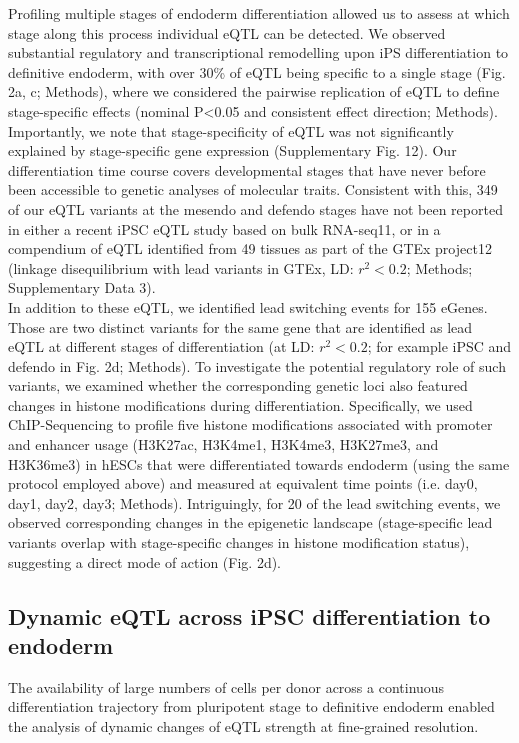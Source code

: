 Profiling multiple stages of endoderm differentiation allowed us to assess at which stage along this process individual eQTL can be detected. 
We observed substantial regulatory and transcriptional remodelling upon iPS differentiation to definitive endoderm, with over 30\% of eQTL being specific to a single stage (Fig. 2a, c; Methods), where we considered the pairwise replication of eQTL to define stage-specific effects (nominal P<0.05 and consistent effect direction; Methods). 
Importantly, we note that stage-specificity of eQTL was not significantly explained by stage-specific gene expression (Supplementary Fig. 12). 
Our differentiation time course covers developmental stages that have never before been accessible to genetic analyses of molecular traits. 
Consistent with this, 349 of our eQTL variants at the mesendo and defendo stages have not been reported in either a recent iPSC eQTL study based on bulk RNA-seq11, or in a compendium of eQTL identified from 49 tissues as part of the GTEx project12 (linkage disequilibrium with lead variants in GTEx, LD: $r^2<0.2$; Methods; Supplementary Data 3).\\

In addition to these eQTL, we identified lead switching events for 155 eGenes. 
Those are two distinct variants for the same gene that are identified as lead eQTL at different stages of differentiation (at LD: $r^2<0.2$; for example iPSC and defendo in Fig. 2d; Methods). 
To investigate the potential regulatory role of such variants, we examined whether the corresponding genetic loci also featured changes in histone modifications during differentiation. 
Specifically, we used ChIP-Sequencing to profile five histone modifications associated with promoter and enhancer usage (H3K27ac, H3K4me1, H3K4me3, H3K27me3, and H3K36me3) in hESCs that were differentiated towards endoderm (using the same protocol employed above) and measured at equivalent time points (i.e. day0, day1, day2, day3; Methods). 
Intriguingly, for 20 of the lead switching events, we observed corresponding changes in the epigenetic landscape (stage-specific lead variants overlap with stage-specific changes in histone modification status), suggesting a direct mode of action (Fig. 2d).

\subsection{Dynamic eQTL across iPSC differentiation to endoderm}

The availability of large numbers of cells per donor across a continuous differentiation trajectory from pluripotent stage to definitive endoderm enabled the analysis of dynamic changes of eQTL strength at fine-grained resolution. 

